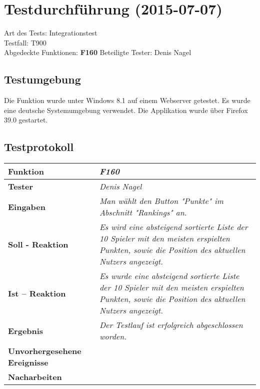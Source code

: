 
\chapter{Testdurchführung (2015-07-07)}

Art des Tests: Integrationstest\\
Testfall: T900\\
Abgedeckte Funktionen: \textbf{F160}
Beteiligte Tester: Denis Nagel\\

\section{Testumgebung}

Die Funktion wurde unter Windows 8.1 auf einem Webserver  getestet. Es wurde eine deutsche Systemumgebung verwendet. Die Applikation wurde über Firefox 39.0 gestartet.

\section{Testprotokoll}

\begin{longtable}{|p{4cm}|p{11cm}|}
\hline
\textbf{Funktion} & \textit{\textbf{F160}} \\
\hline
\textbf{Tester} & \textit{Denis Nagel} \\
\hline
\textbf{Eingaben} & \textit{Man wählt den Button "Punkte" im Abschnitt "Rankings" an.} \\
\hline
\textbf{Soll - Reaktion} & \textit{Es wird eine absteigend sortierte Liste der 10 Spieler mit den meisten erspielten Punkten, sowie die Position des aktuellen Nutzers angezeigt.} \\
\hline
\textbf{Ist -- Reaktion} & \textit{Es wurde eine absteigend sortierte Liste der 10 Spieler mit den meisten erspielten Punkten, sowie die Position des aktuellen Nutzers angezeigt.} \\
\hline
\textbf{Ergebnis} & \textit{Der Testlauf ist erfolgreich abgeschlossen worden.} \\
\hline
\textbf{Unvorhergesehene Ereignisse} &
\textit{} \\
\hline
\textbf{Nacharbeiten } & \textit{} \\
\hline
\end{longtable}

